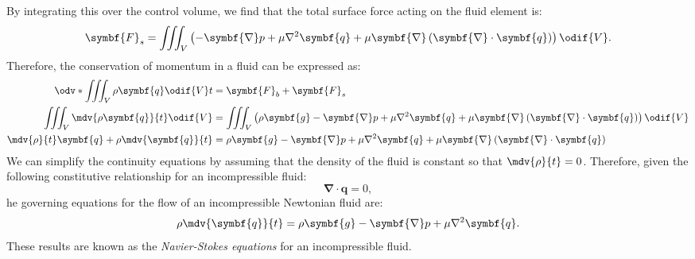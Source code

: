 \documentclass{article}
\theoremstyle{definition}
\begin{document}
By integrating this over the control volume, we find that the total
surface force acting on the fluid element is:
\begin{equation*}
    \symbf{F}_s = \iiint_V \left( -\symbf{\nabla} p + \mu \nabla^2 \symbf{q} + \mu \symbf{\nabla} \left( \symbf{\nabla} \cdot \symbf{q} \right) \right) \odif{V}.
\end{equation*}
Therefore, the conservation of momentum in a fluid can be expressed as:
\begin{align*}
    \odv*{\iiint_V \rho \symbf{q} \odif{V}}{t}        & = \symbf{F}_b + \symbf{F}_s                                                                                                                                     \\
    \iiint_V \mdv{\rho \symbf{q}}{t} \odif{V}         & = \iiint_V \left( \rho \symbf{g} -\symbf{\nabla} p + \mu \nabla^2 \symbf{q} + \mu \symbf{\nabla} \left( \symbf{\nabla} \cdot \symbf{q} \right) \right) \odif{V} \\
    \mdv{\rho}{t} \symbf{q} + \rho \mdv{\symbf{q}}{t} & = \rho \symbf{g} - \symbf{\nabla} p + \mu \nabla^2 \symbf{q} + \mu \symbf{\nabla} \left( \symbf{\nabla} \cdot \symbf{q} \right)                                 \\
\end{align*}
We can simplify the continuity equations by assuming that the density
of the fluid is constant so that \(\displaystyle\mdv{\rho}{t} = 0\).
Therefore, given the following constitutive relationship for an
incompressible fluid:
\begin{equation*}
    \symbf{\nabla} \cdot \symbf{q} = 0,
\end{equation*}
he governing equations for the flow of an incompressible Newtonian fluid
are:
\begin{equation*}
    \rho \mdv{\symbf{q}}{t} = \rho \symbf{g} - \symbf{\nabla} p + \mu \nabla^2 \symbf{q}.
\end{equation*}
These results are known as the \textit{Navier-Stokes equations} for an
incompressible fluid.
\end{document}
